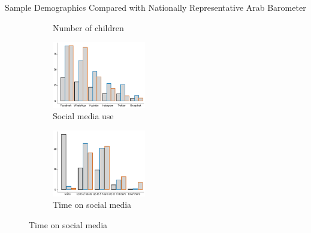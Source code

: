 \documentclass[10pt]{beamer}
\begin{document}
\begin{frame}{Sample Demographics Compared with Nationally Representative Arab Barometer}
{\begin{figure}[H]
\begin{subfigure}{0.25\textwidth}
    \caption{ \scriptsizeptsize Number of children}
  \label{fig:4}
\end{subfigure}\hfil
\begin{subfigure}{0.25\textwidth}
  \includegraphics[height=2.9cm,width=4cm\linewidth, clip=true, trim = 0 5 0 5]{Figures/AB/grey_solid/which_sm.pdf}
    \caption{\scriptsizeptsize Social media use}
  \label{fig:5}
\end{subfigure}\hfil
\begin{subfigure}{0.25\textwidth}
  \includegraphics[height=2.9cm,width=3.5cm\linewidth, clip=true, trim = 0 5 0 5]{Figures/AB/grey_solid/hours_sm.pdf}
    \caption{\scriptsizeptsize Time on social media}
  \label{fig:6}
\end{subfigure}
\end{figure}}
\end{frame}
    
\end{document}
